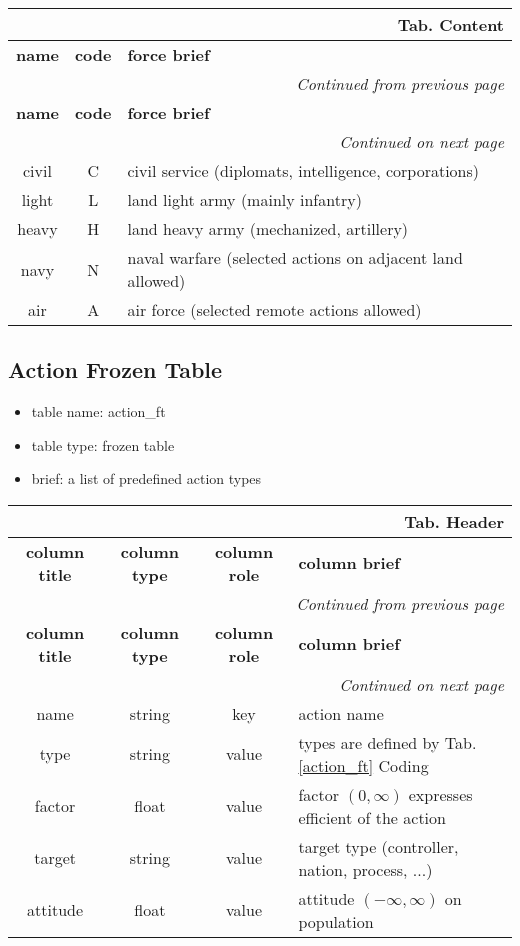 \documentclass[a4paper,oneside,titlepage]{report}
\newcommand*{\LTHeaderIII}[4]{
  \multicolumn{3}{r}{\textbf{Tab. \thesubsection} \textbf{#1}}\\    
  \hline
  \textbf{#2} & \textbf{#3} & \textbf{#4}\\
  \hline

  \endfirsthead
  \multicolumn{3}{r}{\textit{Continued from previous page}}\\    
  \hline
  \textbf{#2} & \textbf{#3} & \textbf{#4}\\
  \hline
  \endhead
  \hline
  \multicolumn{3}{r}{\textit{Continued on next page}}\\
  \endfoot
  \hline
  \endlastfoot  
}
\newcommand*{\LTHeaderIV}[5]{
  \multicolumn{4}{r}{\textbf{Tab. \thesubsection} \textbf{#1}}\\    
  \hline
  \textbf{#2} & \textbf{#3} & \textbf{#4} & \textbf{#5}\\
  \hline
  
  \endfirsthead
  \multicolumn{4}{r}{\textit{Continued from previous page}}\\    
  \hline
  \textbf{#2} & \textbf{#3} & \textbf{#4} & \textbf{#5}\\
  \hline
  \endhead
  \hline
  \multicolumn{4}{r}{\textit{Continued on next page}}\\
  \endfoot
  \hline
  \endlastfoot  
}
\begin{document}
\vspace{-0.5cm}
\begin{longtable}{ |c|c|l| }    
  \LTHeaderIII{Content}{name}{code}{force brief}                    
  civil & C & civil service (diplomats, intelligence, corporations)\\
  light & L & land light army (mainly infantry)\\
  heavy & H & land heavy army (mechanized, artillery)\\
  navy & N & naval warfare (selected actions on adjacent land allowed)\\
  air & A & air force (selected remote actions allowed)\\
\end{longtable}

\subsection{Action Frozen Table}
\begin{itemize}
  \setlength{\itemsep}{0pt}
  \setlength{\parskip}{0pt}
\item table name: action\_ft  
\item table type: frozen table   
\item brief: a list of predefined action types
\end{itemize}
\label{action_ft}

\vspace{-0.5cm}
\begin{longtable}{|c|c|c|l|}  
  \LTHeaderIV{Header}{column title}{column type}{column role}{column brief}                    
  name & string & key & action name\\
  type & string & value & types are defined by Tab. \ref{action_ft} Coding\\
  factor & float & value & factor $(0, \infty)$ expresses efficient of the action\\
  target & string & value & target type (controller, nation, process, ...)\\
  attitude & float & value & attitude $(-\infty, \infty)$ on population  \\
\end{longtable}
\end{document}
